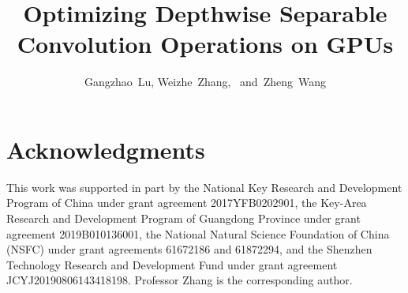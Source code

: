 \documentclass[journal,compsoc,10pt,final]{IEEEtran}
\begin{document}
\title{Optimizing Depthwise Separable Convolution Operations on GPUs}

\author{Gangzhao~Lu, Weizhe~Zhang,~ and~Zheng~Wang
}

\IEEEtitleabstractindextext{

}
\maketitle









\section*{Acknowledgments}
This work was supported in part by the National Key Research and Development Program of China under grant agreement 2017YFB0202901, the
Key-Area Research and Development Program of Guangdong Province under grant agreement 2019B010136001, the National Natural Science
Foundation of China (NSFC) under grant agreements 61672186 and 61872294, and the Shenzhen Technology Research and Development Fund under
grant agreement JCYJ20190806143418198. Professor Zhang is the corresponding author.
\end{document}
